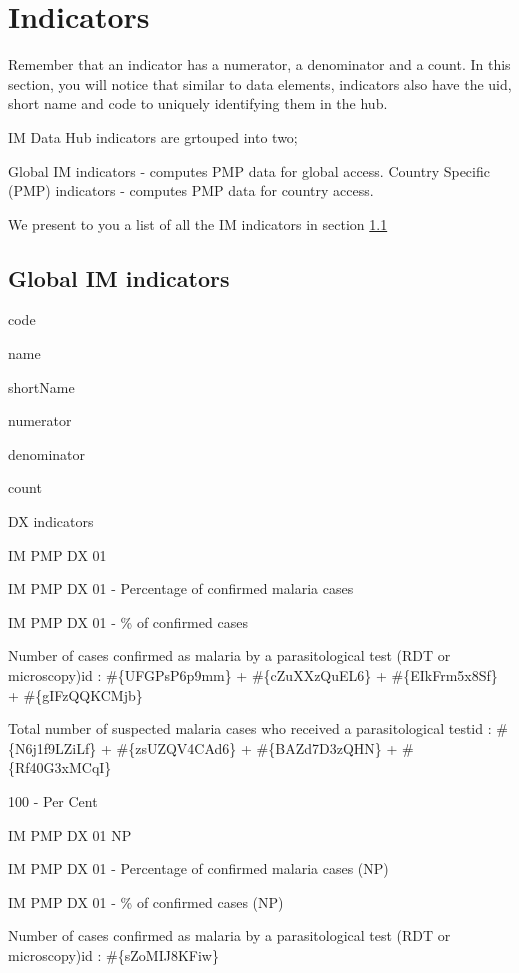 \documentclass[]{book}
\begin{document}
\hypertarget{ind}{%
\section{Indicators}\label{ind}}

Remember that an indicator has a numerator, a denominator and a count. In this section, you will notice that similar to data elements, indicators also have the uid, short name and code to uniquely identifying them in the hub.

IM Data Hub indicators are grtouped into two;

Global IM indicators - computes PMP data for global access.
Country Specific (PMP) indicators - computes PMP data for country access.

We present to you a list of all the IM indicators in section \ref{global-ind}

\hypertarget{global-ind}{%
\subsection{Global IM indicators}\label{global-ind}}

code

name

shortName

numerator

denominator

count

DX indicators

IM PMP DX 01

IM PMP DX 01 - Percentage of confirmed malaria cases

IM PMP DX 01 - \% of confirmed cases

Number of cases confirmed as malaria by a parasitological test (RDT or microscopy)id : \#\{UFGPsP6p9mm\} + \#\{cZuXXzQuEL6\} + \#\{EIkFrm5x8Sf\} + \#\{gIFzQQKCMjb\}

Total number of suspected malaria cases who received a parasitological testid : \#\{N6j1f9LZiLf\} + \#\{zsUZQV4CAd6\} + \#\{BAZd7D3zQHN\} + \#\{Rf40G3xMCqI\}

100 - Per Cent

IM PMP DX 01 NP

IM PMP DX 01 - Percentage of confirmed malaria cases (NP)

IM PMP DX 01 - \% of confirmed cases (NP)

Number of cases confirmed as malaria by a parasitological test (RDT or microscopy)id : \#\{sZoMIJ8KFiw\}
\end{document}
